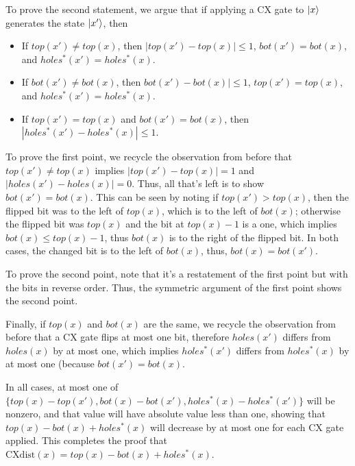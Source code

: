 \documentclass{article}
\begin{document}
To prove the second statement, we argue that if applying a CX gate to $\mathinner{|{x}\rangle}$
generates the state $\mathinner{|{x'}\rangle}$, then
\begin{itemize}
	\item If $top(x') \neq top(x)$, then $|top(x') - top(x)| \leq 1$, 
		$bot(x') = bot(x)$, and $holes^*(x') = holes^*(x)$.
	\item If $bot(x') \neq bot(x)$, then $bot(x') - bot(x)| \leq 1$,
		$top(x') = top(x)$, and $holes^*(x') = holes^*(x)$.
	\item If $top(x') = top(x)$ and $bot(x') = bot(x)$, then
		$|holes^*(x') - holes^*(x)| \leq 1$.
\end{itemize}

To prove the first point, we recycle the observation from before that
$top(x') \neq top(x)$ implies $|top(x') - top(x)| = 1$ and 
$|holes(x') - holes(x)| = 0$. Thus, all that's left is to show 
$bot(x') = bot(x)$. This can be seen by noting if $top(x') > top(x)$, then the 
flipped bit was to the left of $top(x)$, which is to the left of $bot(x)$;
otherwise the flipped bit was $top(x)$ and the bit at $top(x) - 1$ is a one,
which implies $bot(x) \leq top(x) - 1$, thus $bot(x)$ is to the right of the
flipped bit. In both cases, the changed bit is to the left of $bot(x)$, thus,
$bot(x) = bot(x')$.

To prove the second point, note that it's a restatement of the first point but
with the bits in reverse order. Thus, the symmetric argument of the first point
shows the second point.

Finally, if $top(x)$ and $bot(x)$ are the same, we recycle the observation from
before that a CX gate flips at most one bit, therefore $holes(x')$ differs from
$holes(x)$ by at most one, which implies $holes^*(x')$ differs from
$holes^*(x)$ by at most one (because $bot(x') = bot(x)$.

In all cases, at most one of $\{top(x) - top(x'), bot(x) - bot(x'), 
holes^*(x) - holes^*(x')\}$ will be nonzero, and that value will have absolute
value less than one, showing that $top(x) - bot(x) + holes^*(x)$ will decrease
by at most one for each CX gate applied. This completes the proof that
$\text{CXdist}(x) = top(x) - bot(x) + holes^*(x)$.
\end{document}
